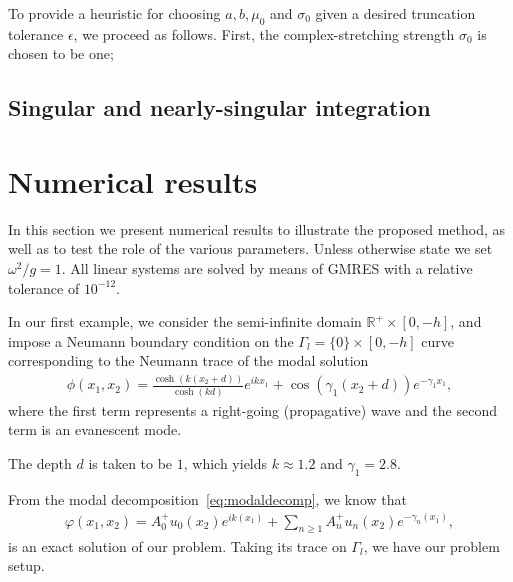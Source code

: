 \documentclass[11pt]{article}
\newcommand{\R}{\mathbb{R}}
\begin{document}
To provide a heuristic for choosing $a,b,\mu_0$ and $\sigma_0$ given a desired
truncation tolerance $\epsilon$, we proceed as follows. First, the
complex-stretching strength $\sigma_0$ is chosen to be one; 

\subsection{Singular and nearly-singular integration} \label{sec:singular-integration}

\section{Numerical results}\label{sec:numerical-results}

In this section we present numerical results to illustrate the proposed method,
as well as to test the role of the various parameters. Unless otherwise state we
set $\omega^2/g =1$. All linear systems are solved by means of GMRES with a
relative tolerance of $10^{-12}$.

In our first example, we consider the semi-infinite domain $\R^+ \times [0,-h]$,
and impose a Neumann boundary condition on the $\Gamma_l = \{ 0 \} \times
[0,-h]$ curve corresponding to the Neumann trace of the modal solution
\begin{align}
  \phi(x_1,x_2) = \frac{\cosh(k(x_2+d))}{\cosh(kd)} e^{i k x_1} + \cos(\gamma_1(x_2+d)) e^{-\gamma_1 x_1},
\end{align}
where the first term represents a right-going (propagative) wave and the second
term is an evanescent mode. 

The depth $d$ is taken to be $1$, which yields $k \approx 1.2$ and
$\gamma_1=2.8$. 

From the
modal decomposition~\cref{eq:modaldecomp}, we know that
\begin{align}
  \varphi(x_1,x_2) = A_0^+u_0(x_2)e^{ik(x_1)} + \sum_{n\geq 1}A_n^+u_n(x_2)e^{-\gamma_n(x_1)},
\end{align}
is an exact solution of our problem. Taking its trace on $\Gamma_l$, we have our
problem setup.
\end{document}
